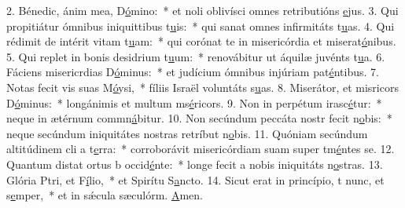 2. Bénedic, ánim mea, D\uline{ó}mino:~* et noli oblivísci omnes retributións \uline{e}jus.
3. Qui propitiátur ómnibus iniquittibus t\uline{u}is:~* qui sanat omnes infirmitáts t\uline{u}as.
4. Qui rédimit de intérit vitam t\uline{u}am:~* qui corónat te in misericórdia et miserat\uline{ó}nibus.
5. Qui replet in bonis desidrium t\uline{u}um:~* renovábitur ut áquilæ juvénts t\uline{u}a.
6. Fáciens misericrdias D\uline{ó}minus:~* et judícium ómnibus injúriam pat\uline{é}ntibus.
7. Notas fecit vis suas M\uline{ó}ysi,~* fíliis Israël voluntáts s\uline{u}as.
8. Miserátor, et misricors D\uline{ó}minus:~* longánimis et multum ms\uline{é}ricors.
9. Non in perpétum irasc\uline{é}tur:~* neque in ætérnum commn\uline{á}bitur.
10. Non secúndum peccáta nostr fecit n\uline{o}bis:~* neque secúndum iniquitátes nostras retríbut n\uline{o}bis.
11. Quóniam secúndum altitúdinem cli a t\uline{e}rra:~* corroborávit misericórdiam suam super tm\uline{é}ntes se.
12. Quantum distat ortus b occid\uline{é}nte:~* longe fecit a nobis iniquitáts n\uline{o}stras.
13. Glória Ptri, et F\uline{í}lio,~* et Spirítu S\uline{a}ncto.
14. Sicut erat in princípio, t nunc, et s\uline{e}mper,~* et in sǽcula sæculórm. \uline{A}men.

